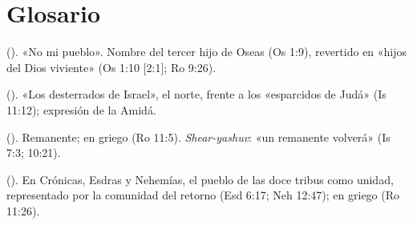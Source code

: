 \section*{Glosario}
\begin{description}\small
\item[Lo-Ammí] (). «No mi pueblo». Nombre del tercer hijo de Oseas (Os 1:9), revertido en «hijos del Dios viviente» (Os 1:10 [2:1]; Ro 9:26).
\item[Nidjé Yisrael] (). «Los desterrados de Israel», el norte, frente a los «esparcidos de Judá» (Is 11:12); expresión de la Amidá.
\item[She'erit] (). Remanente; en griego  (Ro 11:5). \emph{Shear-yashuv}: «un remanente volverá» (Is 7:3; 10:21).
\item[Todo Israel] (). En Crónicas, Esdras y Nehemías, el pueblo de las doce tribus como unidad, representado por la comunidad del retorno (Esd 6:17; Neh 12:47); en griego  (Ro 11:26).
\end{description}

